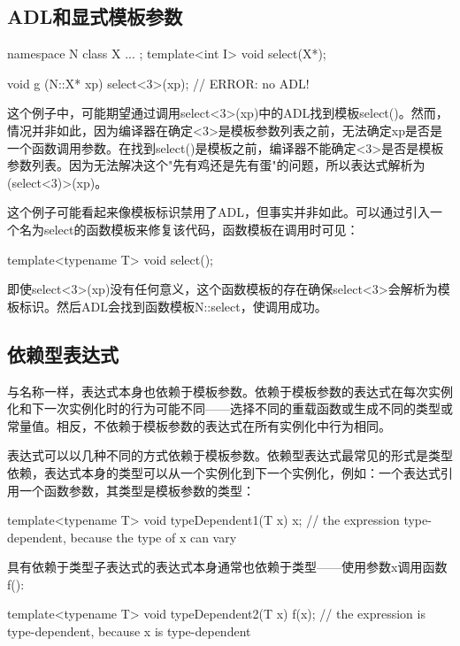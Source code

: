 \subsection{ADL和显式模板参数}

\begin{cpp}
namespace N {
	class X {
		...
	};
	template<int I> void select(X*);
}

void g (N::X* xp) {
	select<3>(xp); // ERROR: no ADL!
}
\end{cpp}

这个例子中，可能期望通过调用select<3>(xp)中的ADL找到模板select()。然而，情况并非如此，因为编译器在确定<3>是模板参数列表之前，无法确定xp是否是一个函数调用参数。在找到select()是模板之前，编译器不能确定<3>是否是模板参数列表。因为无法解决这个"先有鸡还是先有蛋"的问题，所以表达式解析为(select<3)>(xp)。

这个例子可能看起来像模板标识禁用了ADL，但事实并非如此。可以通过引入一个名为select的函数模板来修复该代码，函数模板在调用时可见：

\begin{cpp}
template<typename T> void select();
\end{cpp}

即使select<3>(xp)没有任何意义，这个函数模板的存在确保select<3>会解析为模板标识。然后ADL会找到函数模板N::select，使调用成功。

\subsection{依赖型表达式}

与名称一样，表达式本身也依赖于模板参数。依赖于模板参数的表达式在每次实例化和下一次实例化时的行为可能不同——选择不同的重载函数或生成不同的类型或常量值。相反，不依赖于模板参数的表达式在所有实例化中行为相同。

表达式可以以几种不同的方式依赖于模板参数。依赖型表达式最常见的形式是类型依赖，表达式本身的类型可以从一个实例化到下一个实例化，例如：一个表达式引用一个函数参数，其类型是模板参数的类型：

\begin{cpp}
template<typename T> void typeDependent1(T x) {
	x; // the expression type-dependent, because the type of x can vary
}
\end{cpp}

具有依赖于类型子表达式的表达式本身通常也依赖于类型——使用参数x调用函数f():

\begin{cpp}
template<typename T> void typeDependent2(T x) {
	f(x); // the expression is type-dependent, because x is type-dependent
}
\end{cpp}

